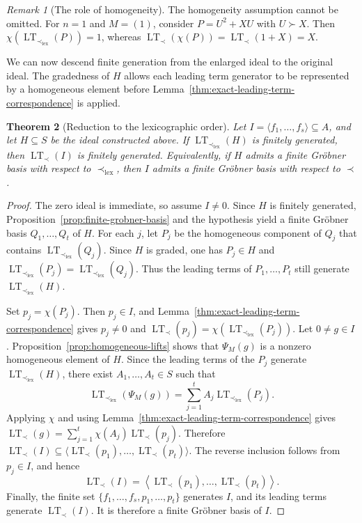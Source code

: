 \documentclass[preprint,12pt,3p]{elsarticle}
\newtheorem{theorem}{Theorem}[section]
\theoremstyle{definition}
\theoremstyle{remark}
\newtheorem{remark}[theorem]{Remark}
\newcommand{\LT}{\operatorname{LT}}
\begin{document}
	\begin{remark}[The role of homogeneity]
		\label{rem:homogeneity-essential}
		The homogeneity assumption cannot be omitted. For $n=1$ and $M=(1)$,
		consider $P=U^2+XU$ with $U\succ X$. Then
		$\chi(\LT_{\prec_{\mathrm{lex}}}(P))=1$, whereas
		$\LT_\prec(\chi(P))=\LT_\prec(1+X)=X$.
	\end{remark}
	
	We can now descend finite generation from the enlarged ideal to the
	original ideal. The gradedness of $H$ allows each leading term
	generator to be represented by a homogeneous element before
	Lemma~\ref{thm:exact-leading-term-correspondence} is applied.
	
	\begin{theorem}[Reduction to the lexicographic order]
		\label{thm:fixed-ideal-reduction}
		Let $I=\langle f_1,\ldots,f_s\rangle\subseteq A$, and let $H\subseteq
		S$ be the ideal constructed above. If
		$\LT_{\prec_{\mathrm{lex}}}(H)$ is finitely generated, then
		$\LT_\prec(I)$ is finitely generated. Equivalently, if $H$ admits a
		finite Gr\"obner basis with respect to $\prec_{\mathrm{lex}}$, then
		$I$ admits a finite Gr\"obner basis with respect to $\prec$.
	\end{theorem}
	
	\begin{proof}
		The zero ideal is immediate, so assume $I\neq0$. Since $H$ is
		finitely generated, Proposition~\ref{prop:finite-grobner-basis}
		and the hypothesis yield a finite Gr\"obner basis
		$Q_1,\ldots,Q_t$ of $H$. For each $j$, let $P_j$ be
		the homogeneous component of $Q_j$ that contains
		$\LT_{\prec_{\mathrm{lex}}}(Q_j)$. Since $H$ is graded, one has
		$P_j\in H$ and
		$\LT_{\prec_{\mathrm{lex}}}(P_j)=
		\LT_{\prec_{\mathrm{lex}}}(Q_j)$. Thus the leading terms of
		$P_1,\ldots,P_t$ still generate
		$\LT_{\prec_{\mathrm{lex}}}(H)$.
		
		Set $p_j=\chi(P_j)$. Then $p_j\in I$, and
		Lemma~\ref{thm:exact-leading-term-correspondence} gives
		$p_j\neq0$ and
		$\LT_\prec(p_j)=
		\chi(\LT_{\prec_{\mathrm{lex}}}(P_j))$. Let $0\neq g\in I$. Proposition~\ref{prop:homogeneous-lifts} shows
		that $\Psi_M(g)$ is a nonzero homogeneous element of $H$. Since the
		leading terms of the $P_j$ generate
		$\LT_{\prec_{\mathrm{lex}}}(H)$, there exist
		$A_1,\ldots,A_t\in S$ such that
		\[
		\LT_{\prec_{\mathrm{lex}}}(\Psi_M(g))
		=
		\sum_{j=1}^t A_j\LT_{\prec_{\mathrm{lex}}}(P_j).
		\]
		Applying $\chi$ and using
		Lemma~\ref{thm:exact-leading-term-correspondence} gives
		$\LT_\prec(g)=\sum_{j=1}^t\chi(A_j)\LT_\prec(p_j)$.
		Therefore $\LT_\prec(I)\subseteq
		\langle\LT_\prec(p_1),\ldots,\LT_\prec(p_t)\rangle$. The reverse
		inclusion follows from $p_j\in I$, and hence
		\begin{equation}
			\label{eq:leading-term-ideal-descent}
			\LT_\prec(I)
			=
			\left\langle\LT_\prec(p_1),\ldots,\LT_\prec(p_t)\right\rangle.
		\end{equation}
		Finally, the finite set
		$\{f_1,\ldots,f_s,p_1,\ldots,p_t\}$ generates $I$, and its leading
		terms generate $\LT_\prec(I)$. It is therefore a finite Gr\"obner
		basis of $I$.
	\end{proof}
	
\end{document}
